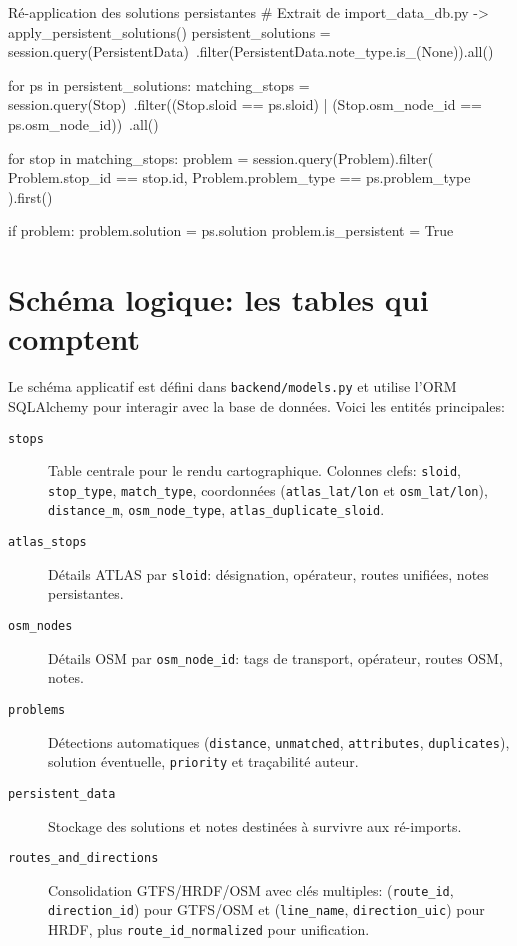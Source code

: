 \begin{codebox}[language=Python]{Ré-application des solutions persistantes}
# Extrait de import_data_db.py -> apply_persistent_solutions()
persistent_solutions = session.query(PersistentData)\
    .filter(PersistentData.note_type.is_(None)).all()

for ps in persistent_solutions:
    matching_stops = session.query(Stop)\
        .filter((Stop.sloid == ps.sloid) | (Stop.osm_node_id == ps.osm_node_id))\
        .all()
    
    for stop in matching_stops:
        problem = session.query(Problem).filter(
            Problem.stop_id == stop.id,
            Problem.problem_type == ps.problem_type
        ).first()
        
        if problem:
            problem.solution = ps.solution
            problem.is_persistent = True
\end{codebox}

\section{Schéma logique: les tables qui comptent}

Le schéma applicatif est défini dans \texttt{backend/models.py} et utilise l'ORM SQLAlchemy pour interagir avec la base de données. Voici les entités principales:

\begin{description}
  \item[\texttt{stops}] Table centrale pour le rendu cartographique. Colonnes clefs: \texttt{sloid}, \texttt{stop\_type}, \texttt{match\_type}, coordonnées (\texttt{atlas\_lat/lon} et \texttt{osm\_lat/lon}), \texttt{distance\_m}, \texttt{osm\_node\_type}, \texttt{atlas\_duplicate\_sloid}.
  
  \item[\texttt{atlas\_stops}] Détails ATLAS par \texttt{sloid}: désignation, opérateur, routes unifiées, notes persistantes.
  
  \item[\texttt{osm\_nodes}] Détails OSM par \texttt{osm\_node\_id}: tags de transport, opérateur, routes OSM, notes.
  
  \item[\texttt{problems}] Détections automatiques (\texttt{distance}, \texttt{unmatched}, \texttt{attributes}, \texttt{duplicates}), solution éventuelle, \texttt{priority} et traçabilité auteur.
  
  \item[\texttt{persistent\_data}] Stockage des solutions et notes destinées à survivre aux ré-imports.
  
  \item[\texttt{routes\_and\_directions}] Consolidation GTFS/HRDF/OSM avec clés multiples: (\texttt{route\_id}, \texttt{direction\_id}) pour GTFS/OSM et (\texttt{line\_name}, \texttt{direction\_uic}) pour HRDF, plus \texttt{route\_id\_normalized} pour unification.
\end{description}

